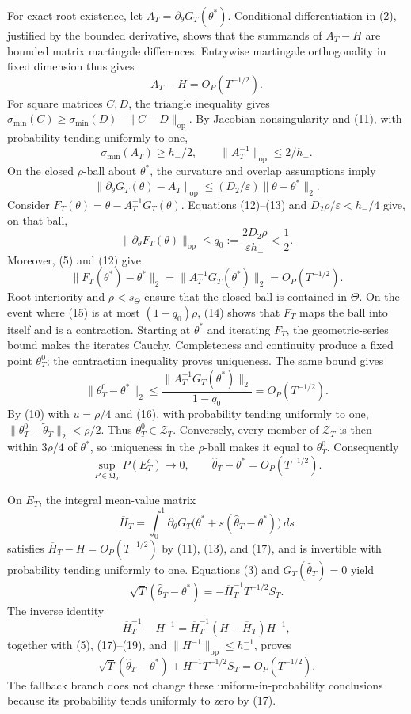 For exact-root existence, let \(A_T=\partial_\theta G_T(\theta^*)\). Conditional differentiation in (2), justified by the bounded derivative, shows that the summands of \(A_T-H\) are bounded matrix martingale differences. Entrywise martingale orthogonality in fixed dimension thus gives
\[
 A_T-H=O_P(T^{-1/2}).
\tag{11}
\]
For square matrices \(C,D\), the triangle inequality gives \(\sigma_{\min}(C)\ge\sigma_{\min}(D)-\|C-D\|_{\mathrm{op}}\). By Jacobian nonsingularity and (11), with probability tending uniformly to one,
\[
 \sigma_{\min}(A_T)\ge h_-/2,
 \qquad \|A_T^{-1}\|_{\mathrm{op}}\le2/h_-.
\tag{12}
\]
On the closed \(\rho\)-ball about \(\theta^*\), the curvature and overlap assumptions imply
\[
 \|\partial_\theta G_T(\theta)-A_T\|_{\mathrm{op}}
 \le (D_2/\varepsilon)\|\theta-\theta^*\|_2.
\tag{13}
\]
Consider \(F_T(\theta)=\theta-A_T^{-1}G_T(\theta)\). Equations (12)--(13) and \(D_2\rho/\varepsilon<h_-/4\) give, on that ball,
\[
 \|\partial_\theta F_T(\theta)\|_{\mathrm{op}}
 \le q_0:=\frac{2D_2\rho}{\varepsilon h_-}<\frac12.
\tag{14}
\]
Moreover, (5) and (12) give
\[
 \|F_T(\theta^*)-\theta^*\|_2
 =\|A_T^{-1}G_T(\theta^*)\|_2=O_P(T^{-1/2}).
\tag{15}
\]
Root interiority and \(\rho<s_\Theta\) ensure that the closed ball is contained in \(\Theta\). On the event where (15) is at most \((1-q_0)\rho\), (14) shows that \(F_T\) maps the ball into itself and is a contraction. Starting at \(\theta^*\) and iterating \(F_T\), the geometric-series bound makes the iterates Cauchy. Completeness and continuity produce a fixed point \(\theta_T^0\); the contraction inequality proves uniqueness. The same bound gives
\[
 \|\theta_T^0-\theta^*\|_2
 \le\frac{\|A_T^{-1}G_T(\theta^*)\|_2}{1-q_0}
 =O_P(T^{-1/2}).
\tag{16}
\]
By (10) with \(u=\rho/4\) and (16), with probability tending uniformly to one, \(\|\theta_T^0-\widetilde\theta_T\|_2<\rho/2\). Thus \(\theta_T^0\in\mathcal Z_T\). Conversely, every member of \(\mathcal Z_T\) is then within \(3\rho/4\) of \(\theta^*\), so uniqueness in the \(\rho\)-ball makes it equal to \(\theta_T^0\). Consequently
\[
 \sup_{P\in\mathfrak Q_T}P(E_T^c)\longrightarrow0,
 \qquad \widehat\theta_T-\theta^*=O_P(T^{-1/2}).
\tag{17}
\]

On \(E_T\), the integral mean-value matrix
\[
 \overline H_T=\int_0^1\partial_\theta G_T
 \bigl(\theta^*+s(\widehat\theta_T-\theta^*)\bigr)\,ds
\tag{18}
\]
satisfies \(\overline H_T-H=O_P(T^{-1/2})\) by (11), (13), and (17), and is invertible with probability tending uniformly to one. Equations (3) and \(G_T(\widehat\theta_T)=0\) yield
\[
 \sqrt T(\widehat\theta_T-\theta^*)
 =-\overline H_T^{-1}T^{-1/2}S_T.
\tag{19}
\]
The inverse identity
\[
 \overline H_T^{-1}-H^{-1}
 =\overline H_T^{-1}(H-\overline H_T)H^{-1},
\tag{20}
\]
together with (5), (17)--(19), and \(\|H^{-1}\|_{\mathrm{op}}\le h_-^{-1}\), proves
\[
 \sqrt T(\widehat\theta_T-\theta^*)+H^{-1}T^{-1/2}S_T
 =O_P(T^{-1/2}).
\tag{21}
\]
The fallback branch does not change these uniform-in-probability conclusions because its probability tends uniformly to zero by (17).

